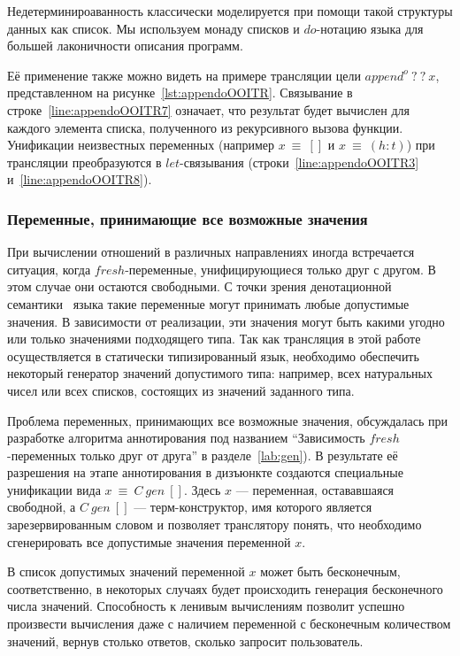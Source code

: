 Недетерминироаванность классически моделируется при помощи такой структуры данных как список. 
Мы используем монаду списков и $do$-нотацию языка \haskell{} для большей лаконичности описания программ.

Её применение также можно видеть на примере трансляции цели $append^o \ ? \ ? \ x$, представленном на рисунке~\ref{lst:appendoOOITR}.
Связывание в строке~\ref{line:appendoOOITR7} означает, что результат будет вычислен для каждого элемента списка, полученного из рекурсивного вызова функции.
Унификации неизвестных переменных (например $x~\equiv~[]$ и $x~\equiv~(h:t)$) при трансляции преобразуются в $let$-связывания (строки~\ref{line:appendoOOITR3} и~\ref{line:appendoOOITR8}). 


\subsubsection{Переменные, принимающие все возможные значения}
\label{sec:transgen}

При вычислении отношений в различных направлениях иногда встречается ситуация, когда $fresh$-переменные, унифицирующиеся только друг с другом.
В этом случае они остаются свободными. 
С точки зрения денотационной семантики~\cite{rozplokhas2019certified} языка \miniKanren{} такие переменные могут принимать любые допустимые значения.
В зависимости от реализации, эти значения могут быть какими угодно или только значениями подходящего типа. 
Так как трансляция в этой работе осуществляется в статически типизированный язык, необходимо обеспечить некоторый генератор значений допустимого типа: например, всех натуральных чисел или всех списков, состоящих из значений заданного типа. 

Проблема переменных, принимающих все возможные значения, обсуждалась при разработке алгоритма аннотирования под названием ``Зависимость $fresh$-переменных только друг от друга'' в разделе~\ref{lab:gen}).
В результате её разрешения на этапе аннотирования в дизъюнкте создаются специальные унификации вида $x~\equiv~C~gen~[]$. 
Здесь $x$ --- переменная, остававшаяся свободной, а $C~gen~[]$ --- терм-конструктор, имя которого является зарезервированным словом и позволяет транслятору понять, что необходимо сгенерировать все допустимые значения переменной $x$.

В \miniKanren{} список допустимых значений переменной $x$ может быть бесконечным, соответственно, в некоторых случаях будет происходить генерация бесконечного числа значений.
Способность \haskell{} к ленивым вычислениям позволит успешно произвести вычисления даже с наличием переменной с бесконечным количеством значений, вернув столько ответов, сколько запросит пользователь.

